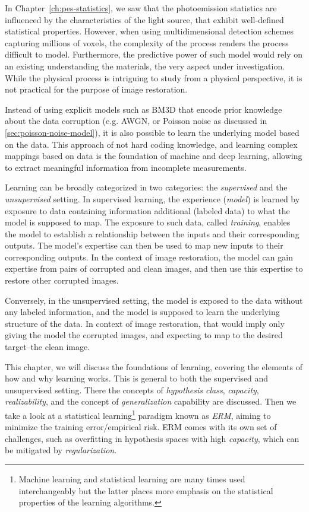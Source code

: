 In Chapter~\ref{ch:pes-statistics}, we saw that the photoemission statistics are influenced by the characteristics of the light source, that exhibit well-defined statistical properties. However, when using multidimensional detection schemes capturing millions of voxels, the complexity of the process renders the process difficult to model. Furthermore, the predictive power of such model would rely on an existing understanding the materials, the very aspect under investigation. While the physical process is intriguing to study from a physical perspective, it is not practical for the purpose of image restoration.

Instead of using explicit models such as \gls{BM3D} that encode prior knowledge about the data corruption (e.g. \gls{AWGN}, or Poisson noise as discussed in \cref{sec:poisson-noise-model}), it is also possible to learn the underlying model based on the data. This approach of not hard coding knowledge, and learning complex mappings based on data is the foundation of machine and deep learning, allowing to extract meaningful information from incomplete measurements.

Learning can be broadly categorized in two categories: the \textit{supervised} and the \textit{unsupervised} setting. In supervised learning, the experience (\textit{model}) is learned by exposure to data containing information additional (labeled data) to what the model is supposed to map. The exposure to such data, called \textit{training}, enables the model to establish a relationship between the inputs and their corresponding outputs. The model’s expertise can then be used to map new inputs to their corresponding outputs. In the context of image restoration, the model can gain expertise from pairs of corrupted and clean images, and then use this expertise to restore other corrupted images.

Conversely, in the unsupervised setting, the model is exposed to the data without any labeled information, and the model is supposed to learn the underlying structure of the data. In context of image restoration, that would imply only giving the model the corrupted images, and expecting to map to the desired target--the clean image.

This chapter, we will discuss the foundations of learning, covering the elements of how and why learning works. This is general to both the supervised and unsupervised setting. There the concepts of \textit{hypothesis class}, \textit{capacity}, \textit{realizability}, and the concept of \textit{generalization} capability are discussed. Then we take a look at a statistical learning\footnote{Machine learning and statistical learning are many times used interchangeably but the latter places more emphasis on the statistical properties of the learning algorithms.} paradigm known as \textit{\gls{ERM}}, aiming to minimize the training error/empirical risk. \Gls{ERM} comes with its own set of challenges, such as overfitting in hypothesis spaces with high \textit{capacity}, which can be mitigated by \textit{regularization}. 


